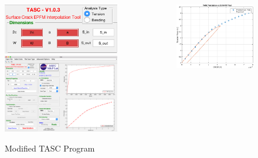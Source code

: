 \begin{frame}
\begin{columns}
\begin{column}{0.45\textwidth}
\begin{figure}[tbp]
\centering
\includegraphics[width=0.8\columnwidth]{tasc-modified-ui} \vspace{1ex}
\includegraphics[width=0.8\columnwidth]{tasc-force-cmod-validation}
\caption{Modified TASC Program}
\end{figure}
\end{column}
\begin{column}{0.45\textwidth}
\begin{figure}[tbp]
\centering
\includegraphics[width=0.75\columnwidth]{experimental-validation}

\end{figure}
\end{column}
\end{columns}
\end{frame}
